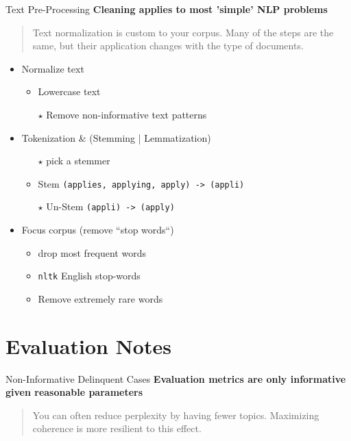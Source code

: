 \documentclass[10pt]{beamer}
\begin{document}
\begin{frame}{Text Pre-Processing}
{\bf Cleaning applies to most 'simple' NLP problems}

\begin{quote}
  Text normalization is custom to your corpus. Many of the steps are the same, but their application changes with the type of documents.
\end{quote}

  \begin{itemize}
  \item Normalize text
    \begin{itemize}
    \item Lowercase text
    \item[$\star$] Remove non-informative text patterns
    \end{itemize}
  \item Tokenization \& (Stemming | Lemmatization)
    \begin{itemize}
    \item[$\star$] pick a stemmer
    \item Stem \hfill\texttt{(applies, applying, apply) -> (appli)}
    \item[$\star$] Un-Stem \hfill\texttt{(appli) -> (apply)}
    \end{itemize}
  \item Focus corpus (remove ``stop words``)
    \begin{itemize}
    \item drop most frequent words
    \item \texttt{nltk} English stop-words
    \item Remove extremely rare words
    \end{itemize}
  \end{itemize}

\end{frame}

\section{Evaluation Notes}

\begin{frame}{Non-Informative Delinquent Cases}
  {\bf Evaluation metrics are only informative given reasonable parameters}

  \begin{quote}
    You can often reduce perplexity by having fewer topics.
    Maximizing coherence is more resilient to this effect.
  \end{quote}
\end{frame}
\end{document}

